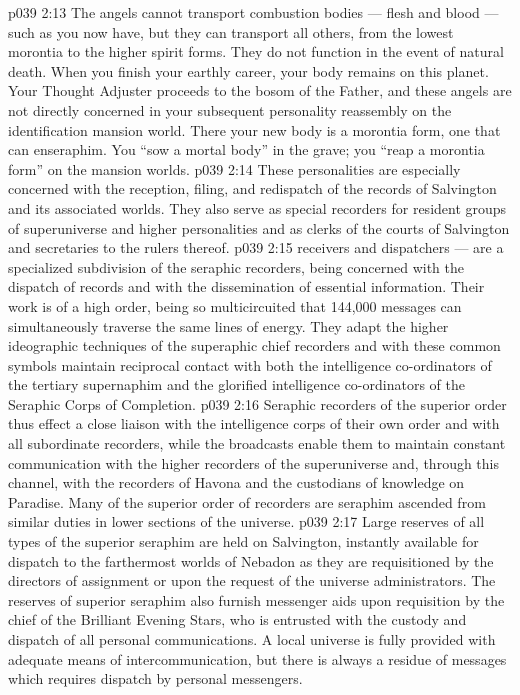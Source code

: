 \vs p039 2:13 \pc The angels cannot transport combustion bodies --- flesh and blood --- such as you now have, but they can transport all others, from the lowest morontia to the higher spirit forms. They do not function in the event of natural death. When you finish your earthly career, your body remains on this planet. Your Thought Adjuster proceeds to the bosom of the Father, and these angels are not directly concerned in your subsequent personality reassembly on the identification mansion world. There your new body is a morontia form, one that can enseraphim. You “sow a mortal body” in the grave; you “reap a morontia form” on the mansion worlds.
\vs p039 2:14 \bibnobreakspace {} These personalities are especially concerned with the reception, filing, and redispatch of the records of Salvington and its associated worlds. They also serve as special recorders for resident groups of superuniverse and higher personalities and as clerks of the courts of Salvington and secretaries to the rulers thereof.
\vs p039 2:15 \pc {} receivers and dispatchers --- are a specialized subdivision of the seraphic recorders, being concerned with the dispatch of records and with the dissemination of essential information. Their work is of a high order, being so multicircuited that 144,000 messages can simultaneously traverse the same lines of energy. They adapt the higher ideographic techniques of the superaphic chief recorders and with these common symbols maintain reciprocal contact with both the intelligence co\hyp{}ordinators of the tertiary supernaphim and the glorified intelligence co\hyp{}ordinators of the Seraphic Corps of Completion.
\vs p039 2:16 Seraphic recorders of the superior order thus effect a close liaison with the intelligence corps of their own order and with all subordinate recorders, while the broadcasts enable them to maintain constant communication with the higher recorders of the superuniverse and, through this channel, with the recorders of Havona and the custodians of knowledge on Paradise. Many of the superior order of recorders are seraphim ascended from similar duties in lower sections of the universe.
\vs p039 2:17 \bibnobreakspace {} Large reserves of all types of the superior seraphim are held on Salvington, instantly available for dispatch to the farthermost worlds of Nebadon as they are requisitioned by the directors of assignment or upon the request of the universe administrators. The reserves of superior seraphim also furnish messenger aids upon requisition by the chief of the Brilliant Evening Stars, who is entrusted with the custody and dispatch of all personal communications. A local universe is fully provided with adequate means of intercommunication, but there is always a residue of messages which requires dispatch by personal messengers.

